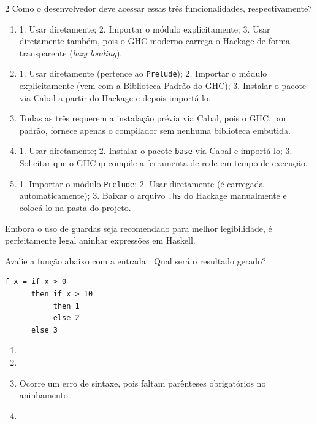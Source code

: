 \documentclass[a4paper,10pt,brazil]{article}
\begin{document}
\begin{multicols}{2}
Como o desenvolvedor deve acessar essas três funcionalidades, respectivamente?

\begin{enumerate}
  \item 1. Usar diretamente; 2. Importar o módulo explicitamente; 3. Usar diretamente também, pois o GHC moderno carrega o Hackage de forma transparente (\emph{lazy loading}).

  \item 1. Usar diretamente (pertence ao \texttt{Prelude}); 2. Importar o módulo explicitamente (vem com a Biblioteca Padrão do GHC); 3. Instalar o pacote via Cabal a partir do Hackage e depois importá-lo.

  \item Todas as três requerem a instalação prévia via Cabal, pois o GHC, por padrão, fornece apenas o compilador sem nenhuma biblioteca embutida.

  \item 1. Usar diretamente; 2. Instalar o pacote \texttt{base} via Cabal e importá-lo; 3. Solicitar que o GHCup compile a ferramenta de rede em tempo de execução.

  \item 1. Importar o módulo \texttt{Prelude}; 2. Usar diretamente (é carregada automaticamente); 3. Baixar o arquivo \texttt{.hs} do Hackage manualmente e colocá-lo na pasta do projeto.


\end{enumerate}

Embora o uso de guardas seja recomendado para melhor legibilidade, é perfeitamente legal aninhar expressões  em Haskell. 

Avalie a função abaixo com a entrada . Qual será o resultado gerado?
\begin{verbatim}
f x = if x > 0
      then if x > 10
           then 1
           else 2
      else 3
\end{verbatim}

\begin{enumerate}
  \item {}

  \item {}

  \item Ocorre um erro de sintaxe, pois faltam parênteses obrigatórios no aninhamento.

  \item {}


\end{enumerate}
\end{multicols}
\end{document}
